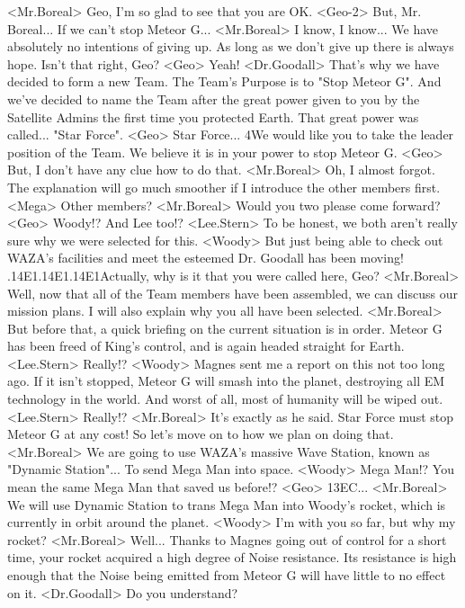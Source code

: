 <Mr.Boreal> Geo, I'm so glad to see that you are OK. 
<Geo-2> But, Mr. Boreal... If we can't stop Meteor G... 
<Mr.Boreal> I know, I know... 
We have absolutely no intentions of giving up. 
As long as we don't give up there is always hope. 
Isn't that right, Geo? 
<Geo> Yeah! 
<Dr.Goodall> That's why we have decided to form a new Team. 
The Team's Purpose is to "Stop Meteor G". 
And we've decided to name the Team after the great power given to you by the 
Satellite Admins the first time you protected Earth. 
That great power was called... 
"Star Force". 
<Geo> Star Force... 
4We would like you to take the leader position of the Team. 
We believe it is in your power to stop Meteor G. 
<Geo> But, I don't have any clue how to do that. 
<Mr.Boreal> Oh, I almost forgot. 
The explanation will go much smoother if I introduce the other members first. 
<Mega> Other members? 
<Mr.Boreal> Would you two please come forward? 
<Geo> Woody!? And Lee too!? 
<Lee.Stern> To be honest, we both aren't really sure why we were selected for this. 
<Woody> But just being able to check out WAZA's facilities and 
meet the esteemed Dr. Goodall has been moving! 
.{14}{E1}.{14}{E1}.{14}{E1}Actually, why is it that you were called here, Geo? 
<Mr.Boreal> Well, now that all of the Team members have been 
assembled, we can discuss our mission plans. 
I will also explain why you all have been selected. 
<Mr.Boreal> But before that, a quick briefing on the current situation is in order. 
Meteor G has been freed of King's control, and is again headed straight for Earth. 
<Lee.Stern> Really!? 
<Woody> Magnes sent me a report on this not too long ago. 
If it isn't stopped, Meteor G will smash into the planet, 
destroying all EM technology in the world. 
And worst of all, most of humanity will be wiped out. 
<Lee.Stern> Really!? 
<Mr.Boreal> It's exactly as he said. 
Star Force must stop Meteor G at any cost! 
So let's move on to how we plan on doing that. 
<Mr.Boreal> We are going to use WAZA's massive Wave Station, known as "Dynamic Station"... 
To send Mega Man into space. 
<Woody> Mega Man!? 
You mean the same Mega Man that saved us before!? 
<Geo> {13}{EC}... 
<Mr.Boreal> We will use Dynamic Station to trans Mega Man into 
Woody's rocket, which is currently in orbit around the planet. 
<Woody> I'm with you so far, but why my rocket? 
<Mr.Boreal> Well... 
Thanks to Magnes going out of control for a short time, 
your rocket acquired a high degree of Noise resistance. 
Its resistance is high enough that the Noise being emitted 
from Meteor G will have little to no effect on it. 
<Dr.Goodall> Do you understand? 
